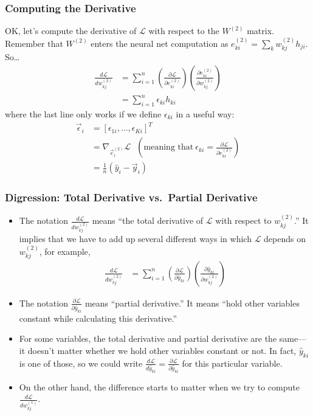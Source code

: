\documentclass{beamer}
\begin{document}
\begin{frame}
  \frametitle{Computing the Derivative}
  OK, let's compute the derivative of ${\mathcal L}$ with respect to the $W^{(2)}$
  matrix.  Remember that $W^{(2)}$ enters the neural net computation as
  $e_{ki}^{(2)}=\sum_k w_{kj}^{(2)}h_{ji}$.  So\ldots
  \begin{align*}
    \frac{d{\mathcal L}}{dw_{kj}^{(2)}} &=
    \sum_{i=1}^n
    \left(\frac{\partial{\mathcal L}}{\partial e_{ki}^{(2)}}\right)
    \left(\frac{\partial e_{ki}^{(2)}}{\partial w_{kj}^{(2)}}\right)\\
    &= \sum_{i=1}^n \epsilon_{ki}h_{ki}
  \end{align*}
  where the last line only works if we define $\epsilon_{ki}$ in
  a useful way:
  \begin{align*}
    \vec\epsilon_i &= [\epsilon_{1i},\ldots,\epsilon_{Ki}]^T \\
    &= \nabla_{\vec{e}_{i}^{(2)}}{\mathcal L}~~~
    \left(\mbox{meaning that}~\epsilon_{ki}=\frac{\partial{\mathcal L}}{\partial e_{ki}^{(2)}}\right)\\
    &= \frac{1}{n}(\hat{y}_{i}-\vec{y}_{i})
  \end{align*}
\end{frame}

\begin{frame}
  \frametitle{Digression: Total Derivative vs.~Partial Derivative}
  \begin{itemize}
  \item The notation $\frac{d{\mathcal L}}{dw_{kj}^{(2)}}$ means
    ``the total derivative of ${\mathcal L}$ with respect to
    $w_{kj}^{(2)}$.'' It implies that we have to add up several
    different ways in which ${\mathcal L}$ depends on
    $w_{kj}^{(2)}$, for example,
    \begin{align*}
      \frac{d{\mathcal L}}{dw_{kj}^{(2)}} &=
      \sum_{i=1}^n
      \left(\frac{\partial{\mathcal L}}{\partial\hat{y}_{ki}}\right)
      \left(\frac{\partial\hat{y}_{ki}}{\partial w_{kj}^{(2)}}\right)
    \end{align*}
  \item The notation $\frac{\partial{\mathcal
      L}}{\partial\hat{y}_{ki}}$ means ``partial derivative.''  It
    means ``hold other variables constant while calculating this
    derivative.''
  \item For some variables, the total derivative and partial
    derivative are the same---it doesn't matter whether we hold other
    variables constant or not.  In fact, $\hat{y}_{ki}$ is one of
    those, so we could write $\frac{d{\mathcal
        L}}{d\hat{y}_{ki}}=\frac{\partial{\mathcal
        L}}{\partial\hat{y}_{ki}}$ for this particular variable.
  \item On the other hand, the difference starts to matter when we try
    to compute $\frac{d{\mathcal L}}{d w_{kj}^{(1)}}$.
  \end{itemize}
\end{frame}
\end{document}
